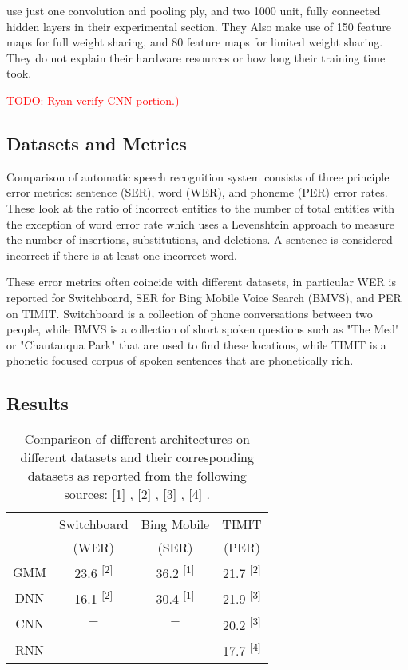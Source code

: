 \documentclass[letterpaper]{article}
\newcommand{\TODO}[1]{\textcolor{red}{TODO: #1}}
\begin{document}
\cite{DBLP:journals/taslp/Abdel-HamidMJDPY14} use just one convolution and pooling ply, and two 1000 unit, fully connected hidden layers in their experimental section. They Also make use of 150 feature maps for full weight sharing, and 80 feature maps for limited weight sharing. They do not explain their hardware resources or how long their training time took.

\TODO{Ryan verify CNN portion.)}

\subsection*{Datasets and Metrics}

Comparison of automatic speech recognition system consists of three principle error metrics: sentence (SER), word (WER), and phoneme (PER) error rates. These look at the ratio of incorrect entities to the number of total entities with the exception of word error rate which uses a Levenshtein approach to measure the number of insertions, substitutions, and deletions. A sentence is considered incorrect if there is at least one incorrect word. 

These error metrics often coincide with different datasets, in particular WER is reported for Switchboard, SER for Bing Mobile Voice Search (BMVS), and PER on TIMIT. Switchboard is a collection of phone conversations between two people, while BMVS is a collection of short spoken questions such as "The Med" or "Chautauqua Park" that are used to find these locations, while TIMIT is a phonetic focused corpus of spoken sentences that are phonetically rich.

\subsection*{Results}

\begin{table}[H]
	\centering
	\begin{tabular}{c|c|c|c}
		& Switchboard & Bing Mobile & TIMIT \\
		& (WER) & (SER) & (PER) \\
		\hline
		GMM & 23.6 \textsuperscript{[2]} & 36.2 \textsuperscript{[1]} & 21.7 \textsuperscript{[2]} \\
		DNN & 16.1 \textsuperscript{[2]} & 30.4 \textsuperscript{[1]} & 21.9 \textsuperscript{[3]} \\
		CNN & $-$ & $-$ & 20.2 \textsuperscript{[3]} \\
		\hline
		RNN & $-$ & $-$ & 17.7 \textsuperscript{[4]}
	\end{tabular}
	\caption{Comparison of different architectures on different datasets and their corresponding datasets as reported from the following sources: [1] \cite{DBLP:journals/taslp/DahlYDA12}, [2] \cite{DBLP:journals/spm/X12a}, [3] \cite{DBLP:journals/taslp/Abdel-HamidMJDPY14}, [4] \cite{DBLP:conf/icassp/GravesMH13}. }
	\label{tbl:results}
\end{table}
\end{document}
